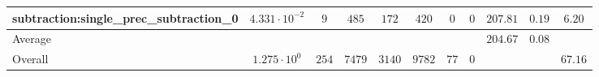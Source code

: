 \begin{tabular}{|l|c|c|c|c|c|c|c|c|c|c|}
subtraction:single\_prec\_subtraction\_0         & $ 4.331 \cdot 10^{-2} $ & $ 9      $ & $ 485  $ & $ 172  $ & $ 420   $ & $ 0  $ & $ 0 $ & $ 207.81      $ & $ 0.19    $ & $ 6.20    $ \\
\hline
Average                                          & $                     $ & $        $ & $      $ & $      $ & $       $ & $    $ & $   $ & $ 204.67      $ & $ 0.08    $ & $         $ \\
\hline
Overall                                          & $ 1.275 \cdot 10^{0}  $ & $ 254    $ & $ 7479 $ & $ 3140 $ & $ 9782  $ & $ 77 $ & $ 0 $ & $             $ & $         $ & $ 67.16   $ \\
\hline
\end{tabular}
